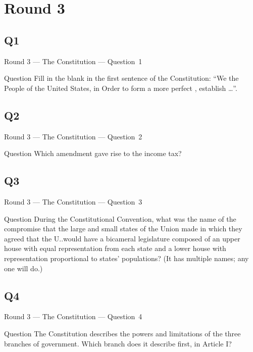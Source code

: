 \documentclass[11pt]{beamer}
\begin{document}
\section{Round 3}
\subsection*{Q1}
\begin{frame}[t]{Round 3 --- The Constitution --- \mbox{Question 1}}
\vspace{-0.5em}
\begin{block}{Question}
Fill in the blank in the first sentence of the Constitution: ``We the People of the United States, in Order to form a more perfect \textunderscore{}\textunderscore{}\textunderscore{}\textunderscore{}\textunderscore{}, establish \ldots{}''.
\end{block}
\end{frame}
\subsection*{Q2}
\begin{frame}[t]{Round 3 --- The Constitution --- \mbox{Question 2}}
\vspace{-0.5em}
\begin{block}{Question}
Which amendment gave rise to the income tax?
\end{block}
\end{frame}
\subsection*{Q3}
\begin{frame}[t]{Round 3 --- The Constitution --- \mbox{Question 3}}
\vspace{-0.5em}
\begin{block}{Question}
During the Constitutional Convention, what was the name of the compromise that the large and small states of the Union made in which they agreed that the U.\@S.\@ would have a bicameral legislature composed of an upper house with equal representation from each state and a lower house with representation proportional to states' populations? (It has multiple names; any one will do.)
\end{block}
\end{frame}
\subsection*{Q4}
\begin{frame}[t]{Round 3 --- The Constitution --- \mbox{Question 4}}
\vspace{-0.5em}
\begin{block}{Question}
The Constitution describes the powers and limitations of the three branches of government. Which branch does it describe first, in Article I\@?
\end{block}
\end{frame}
\end{document}

